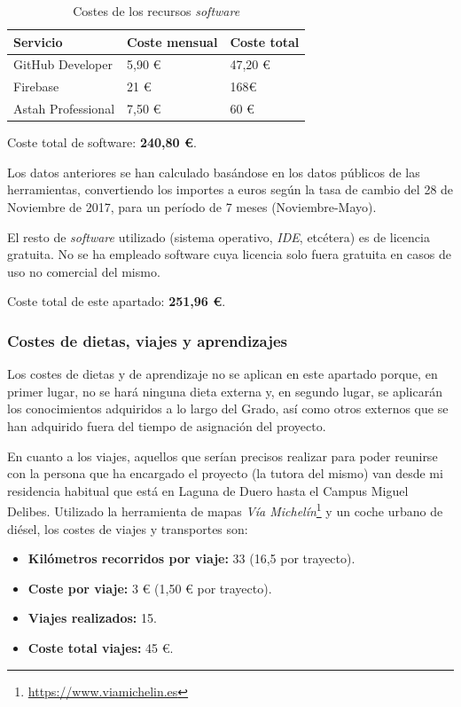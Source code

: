 \documentclass[twoside]{report}
\begin{document}
\begin{table}[H]
\centering
\begin{tabular}{|l|l|l|}
\hline
Servicio         & Coste mensual & Coste total \\ \hline
GitHub Developer & 5,90 \euro        & 47,20 \euro          \\ \hline
Firebase         & 21 \euro      & 168\euro           \\ \hline
Astah Professional & 7,50 \euro & 60 \euro \\ \hline
\end{tabular}
\caption{Costes de los recursos \textit{software}}
\end{table}

Coste total de software: \textbf{240,80 \euro}.

Los datos anteriores se han calculado basándose en los datos públicos de las herramientas, convertiendo los importes a euros según la tasa de cambio del 28 de Noviembre de 2017, para un período de 7 meses (Noviembre-Mayo).

El resto de \textit{software} utilizado (sistema operativo, \textit{IDE}, etcétera) es de licencia gratuita. No se ha empleado software cuya licencia solo fuera gratuita en casos de uso no comercial del mismo.

Coste total de este apartado: \textbf{251,96 \euro}.

\subsubsection{Costes de dietas, viajes y aprendizajes}

Los costes de dietas y de aprendizaje no se aplican en este apartado porque, en primer lugar, no se hará ninguna dieta externa y, en segundo lugar, se aplicarán los conocimientos adquiridos a lo largo del Grado, así como otros externos que se han adquirido fuera del tiempo de asignación del proyecto.

En cuanto a los viajes, aquellos que serían precisos realizar para poder reunirse con la persona que ha encargado el proyecto (la tutora del mismo) van desde mi residencia habitual que está en Laguna de Duero hasta el Campus Miguel Delibes. Utilizado la herramienta de mapas \textit{Vía Michelín}\footnote{\url{https://www.viamichelin.es}} y un coche urbano de diésel, los costes de viajes y transportes son:

\begin{itemize}
\item \textbf{Kilómetros recorridos por viaje:} 33 (16,5 por trayecto).
\item \textbf{Coste por viaje:} 3 \euro \hspace{0.1cm} (1,50 \euro \hspace{0.1cm} por trayecto).
\item \textbf{Viajes realizados:} 15.
\item \textbf{Coste total viajes:} 45 \euro.
\end{itemize}
\end{document}

